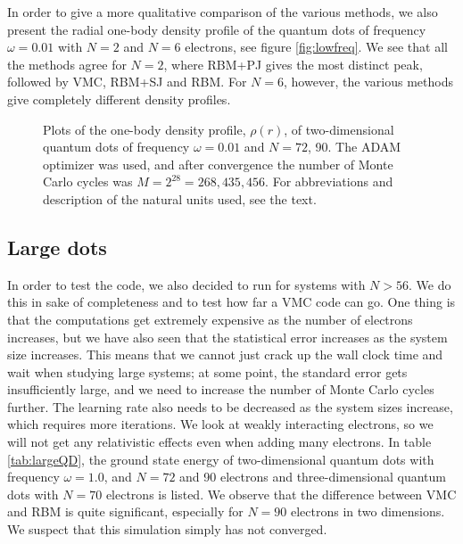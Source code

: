 In order to give a more qualitative comparison of the various methods, we also present the radial one-body density profile of the quantum dots of frequency $\omega=0.01$ with $N=2$ and $N=6$ electrons, see figure \eqref{fig:lowfreq}. We see that all the methods agree for $N=2$, where RBM+PJ gives the most distinct peak, followed by VMC, RBM+SJ and RBM. For $N=6$, however, the various methods give completely different density profiles.

\begin{figure}
	\centering
	\captionsetup[subfigure]{labelformat=empty}
	
	\caption{Plots of the one-body density profile, $\rho(r)$, of two-dimensional quantum dots of frequency $\omega=0.01$ and $N=72$, 90. The ADAM optimizer was used, and after convergence the number of Monte Carlo cycles was $M=2^{28}=268,435,456$. For abbreviations and description of the natural units used, see the text.}
	\label{fig:lowfreq}
\end{figure}

\subsection{Large dots}
In order to test the code, we also decided to run for systems with $N>56$. We do this in sake of completeness and to test how far a VMC code can go. One thing is that the computations get extremely expensive as the number of electrons increases, but we have also seen that the statistical error increases as the system size increases. This means that we cannot just crack up the wall clock time and wait when studying large systems; at some point, the standard error gets insufficiently large, and we need to increase the number of Monte Carlo cycles further. The learning rate also needs to be decreased as the system sizes increase, which requires more iterations.  We look at weakly interacting electrons, so we will not get any relativistic effects even when adding many electrons. In table \eqref{tab:largeQD}, the ground state energy of two-dimensional quantum dots with frequency $\omega=1.0$, and $N=72$ and 90 electrons and three-dimensional quantum dots with $N=70$ electrons is listed. We observe that the difference between VMC and RBM is quite significant, especially for $N=90$ electrons in two dimensions. We suspect that this simulation simply has not converged. 

